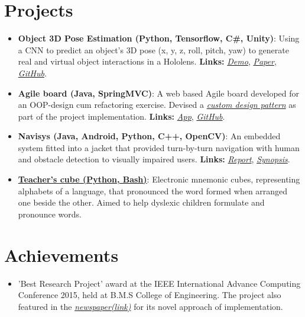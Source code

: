 \documentclass[letterpaper,11pt]{article}
\newcommand{\resumeItem}[2]{
  \linespread{1.1}
  \item\small{
      \textbf{#1}{: #2}
    }
}
\newcommand{\resumePoint}[1]{
  \linespread{1.2}
  \item\small{#1}
}
\newcommand{\resumeSubItem}[2]{\resumeItem{#1}{#2}\vspace{-4pt}}
\newcommand{\resumeSubHeadingListStart}{\begin{itemize}[leftmargin=*]}
\newcommand{\resumeSubHeadingListEnd}{\end{itemize}\vspace{-14pt}}
\begin{document}
%

\section{Projects}
  \resumeSubHeadingListStart
    \resumeSubItem{Object 3D Pose Estimation (Python, Tensorflow, C\#, Unity)}
      {Using a CNN to predict an object\rq s 3D pose (x, y, z, roll, pitch, yaw) to generate real and virtual object interactions in a Hololens. \textbf{Links:}
      \href{https://drive.google.com/file/d/1kCepKQxR73tUTLuvmd1YL3sIbj1GxDdc/view?usp=sharing}{\textit{Demo}}, \href{https://drive.google.com/file/d/1mRwSJ8p2-g-gtBGl1A8seRB8SojWQphm/view?usp=sharing}{\textit{Paper}}, \href{https://github.com/nikhilsu/Object-location-detection}{\textit{GitHub}}.}
      \resumeSubItem{Agile board (Java, SpringMVC)}
      {A web based Agile board developed for an OOP-design cum refactoring exercise. Devised a \href{https://github.com/nikhilsu/Agile-board/blob/master/src/main/java/com/prorg/helper/result/Response.java}{\emph{custom design pattern}} as part of the project implementation. \textbf{Links:}
      \href{https://prorg.herokuapp.com}{\textit{App}}, \href{https://github.com/nikhilsu/Agile-board}{\textit{GitHub}}.}
    \resumeSubItem{Navisys (Java, Android, Python, C++, OpenCV)}
      {An embedded system fitted into a jacket that provided turn-by-turn navigation with human and obstacle detection to visually impaired users. \textbf{Links:}
      \href{https://drive.google.com/file/d/1bFHeZ7-7uwZ0spir3YQ7r0maWdLteEtu/view?usp=sharing}{\textit{Report}},
      \href{https://drive.google.com/file/d/1JWB67U2jjTG7cXZFVjRPVGKsv-rRhgUQ/view?usp=sharing}{\textit{Synopsis}}.}
    \resumeSubItem{\href{https://www.dropbox.com/s/grnct56cpmsiw6c/20160208_234825.mp4?dl=0}{Teacher\rq s cube (Python, Bash)}}
      {Electronic mnemonic cubes, representing alphabets of a language, that pronounced the word formed when arranged one beside the other. Aimed to help dyslexic children formulate and pronounce words.}
    \resumeSubHeadingListEnd

\vspace{5pt}
\section{Achievements}
  \resumeSubHeadingListStart
    \resumePoint{'Best Research Project' award at the IEEE International Advance Computing Conference 2015, held at B.M.S College of Engineering. The project also featured in the \href{https://drive.google.com/open?id=0B0vNhKZyi8qyam1fQ3lfaE1hMkE}{\emph{newspaper(link)}} for its novel approach of implementation.}
  \resumeSubHeadingListEnd
\end{document}
